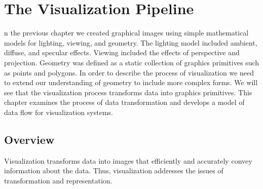 \chapter{The Visualization Pipeline}
\label{chap:vp}

n the previous chapter we created graphical images using simple mathematical models for lighting, viewing, and geometry.
The lighting model included ambient, diffuse, and specular effects.
Viewing included the effects of perspective and projection.
Geometry was defined as a static collection of graphics primitives such as points and polygons.
In order to describe the process of visualization we need to extend our understanding of geometry to include more complex forms.
We will see that the visualization process transforms data into graphics primitives.
This chapter examines the process of data transformation and develops a model of data flow for visualization systems.

\section {Overview}
Visualization transforms data into images that efficiently and accurately convey information about
the data. Thus, visualization addresses the issues of transformation and representation.
